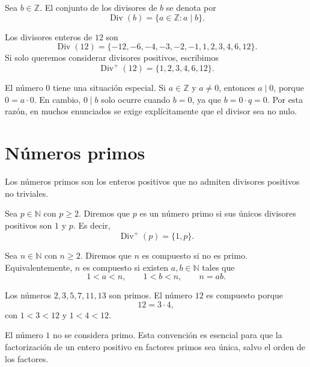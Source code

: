 \begin{definicion}
Sea \(b\in\mathbb{Z}\). El conjunto de los divisores de \(b\) se denota por
\[
\operatorname{Div}(b)=\{a\in\mathbb{Z}:a\mid b\}.
\]
\end{definicion}

\begin{ejemplo}
Los divisores enteros de \(12\) son
\[
\operatorname{Div}(12)=\{-12,-6,-4,-3,-2,-1,1,2,3,4,6,12\}.
\]
Si solo queremos considerar divisores positivos, escribimos
\[
\operatorname{Div}^{+}(12)=\{1,2,3,4,6,12\}.
\]
\end{ejemplo}

\begin{advertencia}
El número \(0\) tiene una situación especial. Si \(a\in\mathbb{Z}\) y \(a\neq 0\), entonces \(a\mid 0\), porque \(0=a\cdot 0\). En cambio, \(0\mid b\) solo ocurre cuando \(b=0\), ya que \(b=0\cdot q=0\). Por esta razón, en muchos enunciados se exige explícitamente que el divisor sea no nulo.
\end{advertencia}

\section{Números primos}

Los números primos son los enteros positivos que no admiten divisores positivos no triviales.

\begin{definicion}
Sea \(p\in\mathbb{N}\) con \(p\geq 2\). Diremos que \(p\) es un número primo si sus únicos divisores positivos son \(1\) y \(p\). Es decir,
\[
\operatorname{Div}^{+}(p)=\{1,p\}.
\]
\end{definicion}

\begin{definicion}
Sea \(n\in\mathbb{N}\) con \(n\geq 2\). Diremos que \(n\) es compuesto si no es primo. Equivalentemente, \(n\) es compuesto si existen \(a,b\in\mathbb{N}\) tales que
\[
1<a<n,
\qquad
1<b<n,
\qquad
n=ab.
\]
\end{definicion}

\begin{ejemplo}
Los números \(2,3,5,7,11,13\) son primos. El número \(12\) es compuesto porque
\[
12=3\cdot 4,
\]
con \(1<3<12\) y \(1<4<12\).
\end{ejemplo}

\begin{advertencia}
El número \(1\) no se considera primo. Esta convención es esencial para que la factorización de un entero positivo en factores primos sea única, salvo el orden de los factores.
\end{advertencia}

